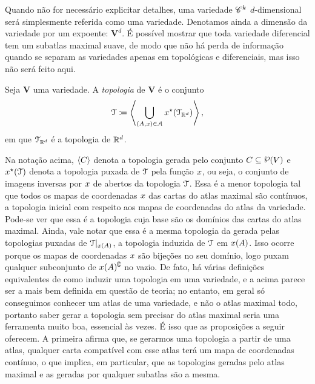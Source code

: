 Quando não for necessário explicitar detalhes, uma variedade $\mathscr{C}^k$ $d$-dimensional será simplesmente referida como uma variedade. Denotamos ainda a dimensão da variedade por um expoente: $\bm V^d$. É possível mostrar que toda variedade diferencial tem um subatlas maximal suave, de modo que não há perda de informação quando se separam as variedades apenas em topológicas e diferenciais, mas isso não será feito aqui.


\begin{definition}
Seja $\bm V$ uma variedade. A \emph{topologia} de $\bm V$ é o conjunto
	\begin{equation*}
	\mathcal{T} \coloneqq  \left\langle \bigcup_{(A,x) \in \mathcal{A}} x^\star(\mathcal{T}_{\mathbb{R}^d}) \right\rangle,
	\end{equation*}
em que $\mathcal{T}_{\mathbb{R}^d}$ é a topologia de $\mathbb{R}^d$.
\end{definition}

Na notação acima, $\left\langle C \right\rangle$ denota a topologia gerada pelo conjunto $C \subseteq \p(V)$ e $x^\star(\mathcal{T})$ denota a topologia puxada de $\mathcal{T}$ pela função $x$, ou seja, o conjunto de imagens inversas por $x$ de abertos da topologia $\mathcal{T}$. Essa é a menor topologia tal que todos os mapas de coordenadas $x$ das cartas do atlas maximal são contínuos, a topologia inicial com respeito aos mapas de coordenadas do atlas da variedade. Pode-se ver que essa é a topologia cuja base são os domínios das cartas do atlas maximal. Ainda, vale notar que essa é a mesma topologia da gerada pelas topologias puxadas de $\mathcal{T}|_{x(A)}$, a topologia induzida de $\mathcal{T}$ em $x(A)$. Isso ocorre porque os mapas de coordenadas $x$ são bijeções no seu domínio, logo puxam qualquer subconjunto de $x(A)^\complement$ no vazio. De fato, há várias definições equivalentes de como induzir uma topologia em uma variedade, e a acima parece ser a mais bem definida em questão de teoria; no entanto, em geral só conseguimos conhecer um atlas de uma variedade, e não o atlas maximal todo, portanto saber gerar a topologia sem precisar do atlas maximal seria uma ferramenta muito boa, essencial às vezes. É isso que as proposições a seguir oferecem. A primeira afirma que, se gerarmos uma topologia a partir de uma atlas, qualquer carta compatível com esse atlas terá um mapa de coordenadas contínuo, o que implica, em particular, que as topologias geradas pelo atlas maximal e as geradas por qualquer subatlas são a mesma.

